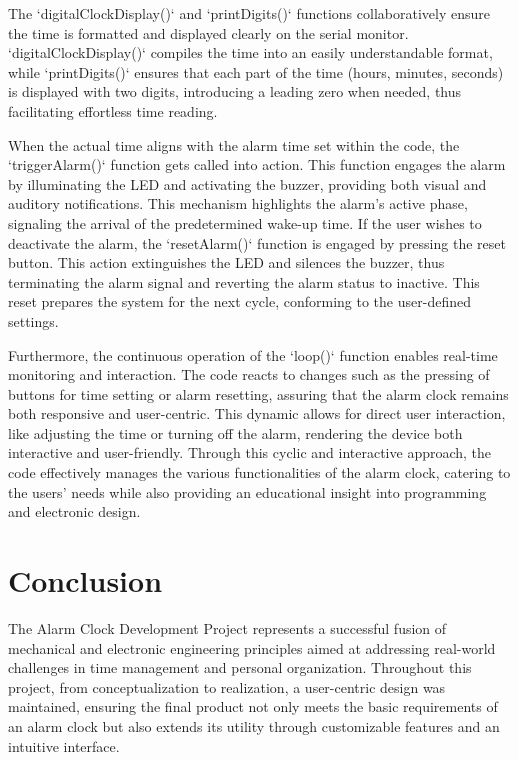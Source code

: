 \documentclass[12pt,a4paper]{article}
\begin{document}
The `digitalClockDisplay()` and `printDigits()` functions collaboratively ensure the time is formatted and displayed clearly on the serial monitor. `digitalClockDisplay()` compiles the time into an easily understandable format, while `printDigits()` ensures that each part of the time (hours, minutes, seconds) is displayed with two digits, introducing a leading zero when needed, thus facilitating effortless time reading.
\newline

When the actual time aligns with the alarm time set within the code, the `triggerAlarm()` function gets called into action. This function engages the alarm by illuminating the LED and activating the buzzer, providing both visual and auditory notifications. This mechanism highlights the alarm's active phase, signaling the arrival of the predetermined wake-up time. If the user wishes to deactivate the alarm, the `resetAlarm()` function is engaged by pressing the reset button. This action extinguishes the LED and silences the buzzer, thus terminating the alarm signal and reverting the alarm status to inactive. This reset prepares the system for the next cycle, conforming to the user-defined settings.
\newline

Furthermore, the continuous operation of the `loop()` function enables real-time monitoring and interaction. The code reacts to changes such as the pressing of buttons for time setting or alarm resetting, assuring that the alarm clock remains both responsive and user-centric. This dynamic allows for direct user interaction, like adjusting the time or turning off the alarm, rendering the device both interactive and user-friendly. Through this cyclic and interactive approach, the code effectively manages the various functionalities of the alarm clock, catering to the users' needs while also providing an educational insight into programming and electronic design.

\section{Conclusion}
The Alarm Clock Development Project represents a successful fusion of mechanical and electronic engineering principles aimed at addressing real-world challenges in time management and personal organization. Throughout this project, from conceptualization to realization, a user-centric design was maintained, ensuring the final product not only meets the basic requirements of an alarm clock but also extends its utility through customizable features and an intuitive interface.
\end{document}
